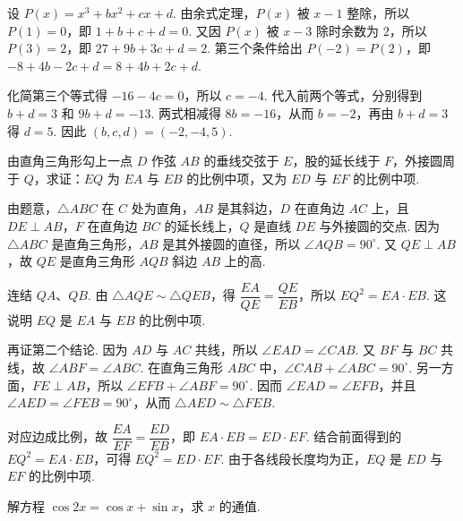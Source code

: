 \begin{solution}
设 \(P(x)=x^{3}+bx^{2}+cx+d\). 由余式定理，\(P(x)\) 被 \(x-1\) 整除，所以 \(P(1)=0\)，即 \(1+b+c+d=0\). 又因 \(P(x)\) 被 \(x-3\) 除时余数为 \(2\)，所以 \(P(3)=2\)，即 \(27+9b+3c+d=2\). 第三个条件给出 \(P(-2)=P(2)\)，即 \(-8+4b-2c+d=8+4b+2c+d\).

化简第三个等式得 \(-16-4c=0\)，所以 \(c=-4\). 代入前两个等式，分别得到 \(b+d=3\) 和 \(9b+d=-13\). 两式相减得 \(8b=-16\)，从而 \(b=-2\)，再由 \(b+d=3\) 得 \(d=5\). 因此 \((b,c,d)=(-2,-4,5)\).
\end{solution}

\begin{problem}
由直角三角形勾上一点 \(D\) 作弦 \(AB\) 的垂线交弦于 \(E\)，股的延长线于 \(F\)，外接圆周于 \(Q\)，求证：\(EQ\) 为 \(EA\) 与 \(EB\) 的比例中项，又为 \(ED\) 与 \(EF\) 的比例中项.
\end{problem}

\begin{solution}
由题意，\(\triangle ABC\) 在 \(C\) 处为直角，\(AB\) 是其斜边，\(D\) 在直角边 \(AC\) 上，且 \(DE\perp AB\)，\(F\) 在直角边 \(BC\) 的延长线上，\(Q\) 是直线 \(DE\) 与外接圆的交点. 因为 \(\triangle ABC\) 是直角三角形，\(AB\) 是其外接圆的直径，所以 \(\angle AQB=90^{\circ}\). 又 \(QE\perp AB\)，故 \(QE\) 是直角三角形 \(AQB\) 斜边 \(AB\) 上的高.

连结 \(QA\)、\(QB\). 由 \(\triangle AQE\sim\triangle QEB\)，得 \(\dfrac{EA}{QE}=\dfrac{QE}{EB}\)，所以 \(EQ^{2}=EA\cdot EB\). 这说明 \(EQ\) 是 \(EA\) 与 \(EB\) 的比例中项.

再证第二个结论. 因为 \(AD\) 与 \(AC\) 共线，所以 \(\angle EAD=\angle CAB\). 又 \(BF\) 与 \(BC\) 共线，故 \(\angle ABF=\angle ABC\). 在直角三角形 \(ABC\) 中，\(\angle CAB+\angle ABC=90^{\circ}\). 另一方面，\(FE\perp AB\)，所以 \(\angle EFB+\angle ABF=90^{\circ}\). 因而 \(\angle EAD=\angle EFB\)，并且 \(\angle AED=\angle FEB=90^{\circ}\)，从而 \(\triangle AED\sim\triangle FEB\).

对应边成比例，故 \(\dfrac{EA}{EF}=\dfrac{ED}{EB}\)，即 \(EA\cdot EB=ED\cdot EF\). 结合前面得到的 \(EQ^{2}=EA\cdot EB\)，可得 \(EQ^{2}=ED\cdot EF\). 由于各线段长度均为正，\(EQ\) 是 \(ED\) 与 \(EF\) 的比例中项.
\end{solution}

\begin{problem}
解方程 \(\cos 2x=\cos x+\sin x\)，求 \(x\) 的通值.
\end{problem}

